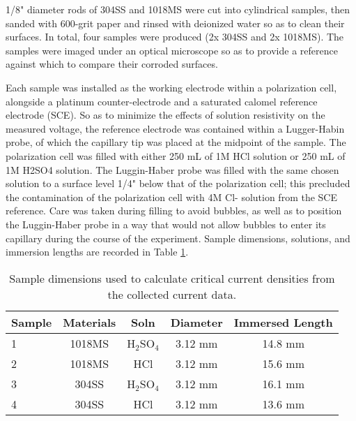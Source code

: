 1/8" diameter rods of 304SS and 1018MS were cut into cylindrical samples, then sanded with 600-grit paper and rinsed with deionized water so as to clean their surfaces.\cite{labguide}  In total, four samples were produced (2x 304SS and 2x 1018MS).  The samples were imaged under an optical microscope so as to provide a reference against which to compare their corroded surfaces.

Each sample was installed as the working electrode within a polarization cell, alongside a platinum counter-electrode and a saturated calomel reference electrode (SCE).  So as to minimize the effects of solution resistivity on the measured voltage, the reference electrode was contained within a Lugger-Habin probe, of which the capillary tip was placed at the midpoint of the sample.  The polarization cell was filled with either 250 mL of 1M HCl solution or 250 mL of 1M H2SO4 solution.  The Luggin-Haber probe was filled with the same chosen solution to a surface level 1/4" below that of the polarization cell; this precluded the contamination of the polarization cell with 4M Cl- solution from the SCE reference.  Care was taken during filling to avoid bubbles, as well as to position the Luggin-Haber probe in a way that would not allow bubbles to enter its capillary during the course of the experiment.\cite{labguide}  Sample dimensions, solutions, and immersion lengths are recorded in Table \ref{table:samples}.

\begin{table}[h!]
	\centering
	\begin{tabular}{lcccc}
	\toprule
	Sample & Materials & Soln & Diameter & Immersed Length \\
	\midrule
	1 & 1018MS & H$_2$SO$_4$ & 3.12 mm & 14.8 mm \\
	2 & 1018MS & HCl	 & 3.12 mm & 15.6 mm \\
	3 & 304SS  & H$_2$SO$_4$ & 3.12 mm & 16.1 mm \\
	4 & 304SS  & HCl	 & 3.12 mm & 13.6 mm \\
	\bottomrule
	\end{tabular}
	\caption{Sample dimensions used to calculate critical current densities from the collected current data.}
	\label{table:samples}
\end{table}

